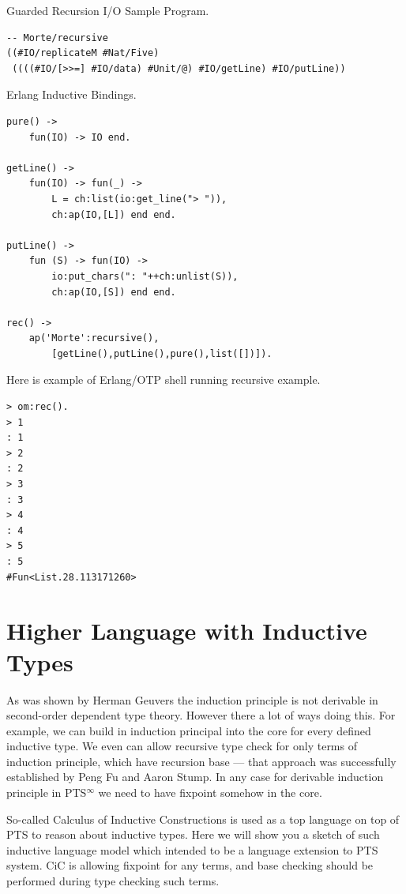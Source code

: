 \documentclass{aip-cp}
\begin{document}
Guarded Recursion I/O Sample Program.

\begin{lstlisting}[mathescape=true]
-- Morte/recursive
((#IO/replicateM #Nat/Five)
 ((((#IO/[>>=] #IO/data) #Unit/@) #IO/getLine) #IO/putLine))
\end{lstlisting}

Erlang Inductive Bindings.

\begin{lstlisting}[mathescape=true]
pure() ->
    fun(IO) -> IO end.

getLine() ->
    fun(IO) -> fun(_) ->
        L = ch:list(io:get_line("> ")),
        ch:ap(IO,[L]) end end.

putLine() ->
    fun (S) -> fun(IO) ->
        io:put_chars(": "++ch:unlist(S)),
        ch:ap(IO,[S]) end end.

rec() ->
    ap('Morte':recursive(),
        [getLine(),putLine(),pure(),list([])]).
\end{lstlisting}


Here is example of Erlang/OTP shell running recursive example.

\begin{lstlisting}[mathescape=true]
> om:rec().
> 1
: 1
> 2
: 2
> 3
: 3
> 4
: 4
> 5
: 5
#Fun<List.28.113171260>
\end{lstlisting}

\section{Higher Language with Inductive Types}
As was shown by Herman Geuvers\cite{Geuvers01} the induction principle is not derivable in second-order dependent type theory.
However there a lot of ways doing this. For example, we can build in induction principal into the core for every defined inductive type.
We even can allow recursive type check for only terms of induction principle, which have recursion base --- that approach was successfully established by Peng Fu and Aaron Stump\cite{Stump17}.
In any case for derivable induction principle in PTS$^\infty$ we need to have fixpoint somehow in the core.

So-called Calculus of Inductive Constructions\cite{Mohring15} is used as a top language on top of PTS to reason about inductive types.
Here we will show you a sketch of such inductive language model which intended to be a language extension to PTS system.
CiC is allowing fixpoint for any terms, and base checking should be performed during type checking such terms.
\end{document}
